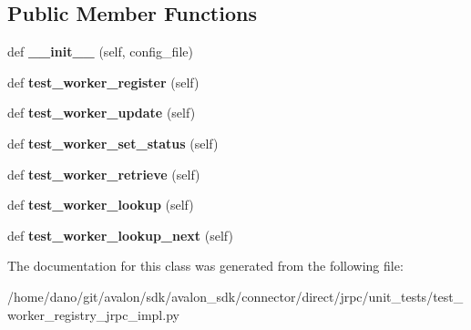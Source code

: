\subsection*{Public Member Functions}
\begin{DoxyCompactItemize}
\item 
\mbox{\label{classtest__worker__registry__jrpc__impl_1_1TestWorkerRegistryJRPCImpl_a88a1d0d89a42885a41c71641f87e1236}} 
def {\bfseries \+\_\+\+\_\+init\+\_\+\+\_\+} (self, config\+\_\+file)
\item 
\mbox{\label{classtest__worker__registry__jrpc__impl_1_1TestWorkerRegistryJRPCImpl_add1bc3439598e05e6c12f48709e9489f}} 
def {\bfseries test\+\_\+worker\+\_\+register} (self)
\item 
\mbox{\label{classtest__worker__registry__jrpc__impl_1_1TestWorkerRegistryJRPCImpl_a1ef289fdb5b9165f04a982882f08eb92}} 
def {\bfseries test\+\_\+worker\+\_\+update} (self)
\item 
\mbox{\label{classtest__worker__registry__jrpc__impl_1_1TestWorkerRegistryJRPCImpl_ac70b8579e11a4d90721759b9091f0a2e}} 
def {\bfseries test\+\_\+worker\+\_\+set\+\_\+status} (self)
\item 
\mbox{\label{classtest__worker__registry__jrpc__impl_1_1TestWorkerRegistryJRPCImpl_ae745e4ebfd5e3d300487d79adf97fd35}} 
def {\bfseries test\+\_\+worker\+\_\+retrieve} (self)
\item 
\mbox{\label{classtest__worker__registry__jrpc__impl_1_1TestWorkerRegistryJRPCImpl_ac50a9e7c822aa7a7c0547da68d706911}} 
def {\bfseries test\+\_\+worker\+\_\+lookup} (self)
\item 
\mbox{\label{classtest__worker__registry__jrpc__impl_1_1TestWorkerRegistryJRPCImpl_a09ec08a130d55485a73ac64822b35d46}} 
def {\bfseries test\+\_\+worker\+\_\+lookup\+\_\+next} (self)
\end{DoxyCompactItemize}


The documentation for this class was generated from the following file\+:\begin{DoxyCompactItemize}
\item 
/home/dano/git/avalon/sdk/avalon\+\_\+sdk/connector/direct/jrpc/unit\+\_\+tests/test\+\_\+worker\+\_\+registry\+\_\+jrpc\+\_\+impl.\+py\end{DoxyCompactItemize}
